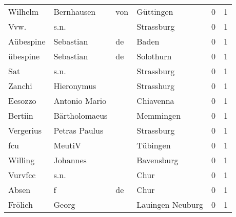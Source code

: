 \documentclass[10pt,a4paper,landscape]{article}
\begin{document}
\begin{longtable}{llllrr}
                  Wilhelm &                         Bernhausen &         von &                                   Güttingen &          0 &         1 \\
                     Vvw. &                               s.n. &             &                                  Strassburg &          0 &         1 \\
                Aübespine &                          Sebastian &          de &                                       Baden &          0 &         1 \\
                 übespine &                          Sebastian &          de &                                   Solothurn &          0 &         1 \\
                      Sat &                               s.n. &             &                                  Strassburg &          0 &         1 \\
                   Zanchi &                         Hieronymus &             &                                  Strasshurg &          0 &         1 \\
                  Eesozzo &                      Antonio Mario &             &                                   Chiavenna &          0 &         1 \\
                  Bertiin &                      Bärtholomaeus &             &                                   Memmingen &          0 &         1 \\
                Vergerius &                      Petras Paulus &             &                                  Strassburg &          0 &         1 \\
                      fcu &                             MeutiV &             &                                    Tübingen &          0 &         1 \\
                  Willing &                           Johannes &             &                                  Bavensburg &          0 &         1 \\
                  Vurvfcc &                               s.n. &             &                                        Chur &          0 &         1 \\
                    Absen &                                  f &          de &                                        Chur &          0 &         1 \\
                  Frölich &                              Georg &             &                            Lauingen Neuburg &          0 &         1 \\

\end{longtable}
\end{document}
